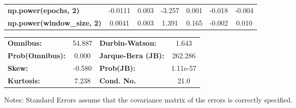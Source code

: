 \begin{center}
\begin{tabular}{lcccccc}
\textbf{np.power(epochs, 2)}         &      -0.0111  &        0.003     &    -3.257  &         0.001        &       -0.018    &       -0.004     \\
\textbf{np.power(window\_size, 2)}   &       0.0041  &        0.003     &     1.391  &         0.165        &       -0.002    &        0.010     \\
\bottomrule
\end{tabular}
\begin{tabular}{lclc}
\textbf{Omnibus:}       & 54.887 & \textbf{  Durbin-Watson:     } &    1.643  \\
\textbf{Prob(Omnibus):} &  0.000 & \textbf{  Jarque-Bera (JB):  } &  262.286  \\
\textbf{Skew:}          & -0.580 & \textbf{  Prob(JB):          } & 1.11e-57  \\
\textbf{Kurtosis:}      &  7.238 & \textbf{  Cond. No.          } &     21.0  \\
\bottomrule
\end{tabular}
\end{center}

Notes: \newline
 [1] Standard Errors assume that the covariance matrix of the errors is correctly specified.